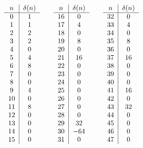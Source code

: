 \documentclass[12pt]{amsart}
\theoremstyle{definition}
\numberwithin{equation}{section}
\begin{document}
\[
\begin{tabular}{c|c}
$n$ & $\delta(n)$\\
\hline
 0 & 1 \\ 1 & 1 \\ 2 & 2 \\ 3 & 2 \\ 4 & 0 \\ 5 & 4\\ 6 & 8 \\ 7 & 0 \\ 8 & 0\\ 9 & 4 \\ 10 & 0\\ 11& 8 \\ 12 & 0 \\ 13 & 0 \\ 14 & 0 \\ 15 & 0 
\end{tabular}\qquad
\begin{tabular}{c|c}
    $n$ & $\delta(n)$ \\
    \hline
     16 & 0\\ 17 & 4 \\ 18 & 0 \\ 19 & 8 \\ 20 & 0 \\ 21 & 16 \\ 22 & 0 \\ 23 & 0 \\ 24 & 0 \\ 25 & 0 \\ 26 & 0 \\ 27 & 0 \\ 28 & 0 \\ 29 & 32 \\ 30 & $-64$ \\ 31 & 0
\end{tabular}\qquad
\begin{tabular}{c|c}
$n$ & $\delta(n)$\\
\hline
32 & 0 \\ 33 & 4 \\ 34 & 0 \\ 35 & 8 \\
36 & 0 \\ 37 & 16 \\ 38 & 0 \\ 39 & 0 \\ 40 & 0 \\ 41 & 16 \\ 42 & 0 \\ 43 & 32 \\ 44 & 0\\ 45 & 0\\ 46 & 0\\ 47 & 0

\end{tabular}\]
\end{document}
